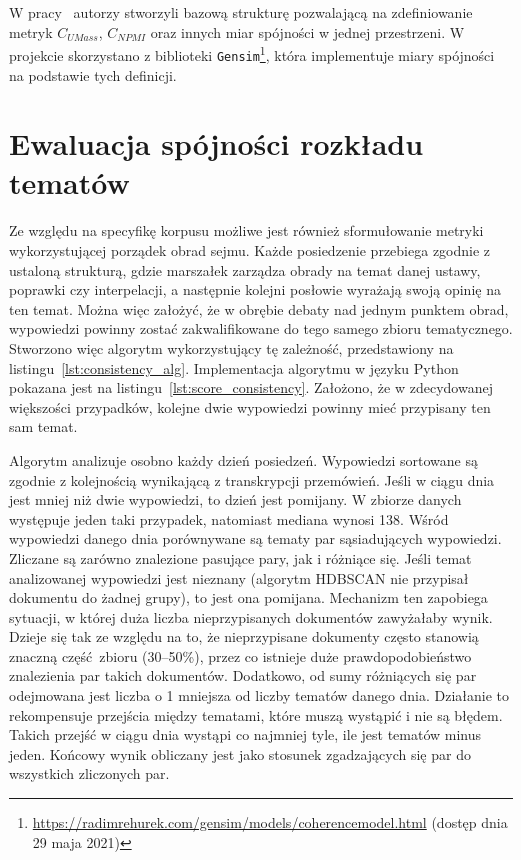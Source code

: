 	W pracy~\cite{Eval_Topics} autorzy stworzyli bazową strukturę pozwalającą na zdefiniowanie metryk \(C_{UMass}\), \(C_{NPMI}\)
		oraz innych miar spójności w jednej przestrzeni.
	W projekcie skorzystano z biblioteki \verb|Gensim|\footnote{\url{https://radimrehurek.com/gensim/models/coherencemodel.html} (dostęp dnia 29 maja 2021)},
		która implementuje miary spójności na podstawie tych definicji.

\section{Ewaluacja spójności rozkładu tematów}\label{sec:consistency_scores}
	Ze względu na specyfikę korpusu możliwe jest również sformułowanie metryki wykorzystującej porządek obrad sejmu.
	Każde posiedzenie przebiega zgodnie z ustaloną strukturą, gdzie marszałek zarządza obrady na temat danej ustawy, poprawki czy interpelacji,
		a następnie kolejni posłowie wyrażają swoją opinię na ten temat.
	Można więc założyć, że w obrębie debaty nad jednym punktem obrad, wypowiedzi powinny zostać zakwalifikowane do tego samego zbioru tematycznego.
	Stworzono więc algorytm wykorzystujący tę zależność, przedstawiony na listingu~\ref{lst:consistency_alg}.
	Implementacja algorytmu w języku Python pokazana jest na listingu~\ref{lst:score_consistency}.
	Założono, że w zdecydowanej większości przypadków, kolejne dwie wypowiedzi powinny mieć przypisany ten sam temat.

	Algorytm analizuje osobno każdy dzień posiedzeń.
	Wypowiedzi sortowane są zgodnie z kolejnością wynikającą z transkrypcji przemówień.
	Jeśli w ciągu dnia jest mniej niż dwie wypowiedzi, to dzień jest pomijany.
	W zbiorze danych występuje jeden taki przypadek, natomiast mediana wynosi 138.
	Wśród wypowiedzi danego dnia porównywane są tematy par sąsiadujących wypowiedzi.
	Zliczane są zarówno znalezione pasujące pary, jak i różniące się.
	Jeśli temat analizowanej wypowiedzi jest nieznany (algorytm HDBSCAN nie przypisał dokumentu do żadnej grupy),
		to jest ona pomijana.
	Mechanizm ten zapobiega sytuacji, w której duża liczba nieprzypisanych dokumentów zawyżałaby wynik.
	Dzieje się tak ze względu na to, że nieprzypisane dokumenty często stanowią znaczną część zbioru (30--50\%),
		przez co istnieje duże prawdopodobieństwo znalezienia par takich dokumentów.
	Dodatkowo, od sumy różniących się par odejmowana jest liczba o 1 mniejsza od liczby tematów danego dnia.
	Działanie to rekompensuje przejścia między tematami, które muszą wystąpić i nie są błędem.
	Takich przejść w ciągu dnia wystąpi co najmniej tyle, ile jest tematów minus jeden.
	Końcowy wynik obliczany jest jako stosunek zgadzających się par do wszystkich zliczonych par.
	
